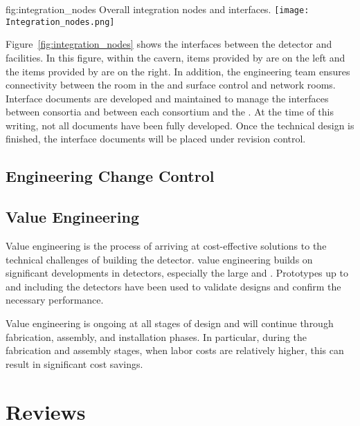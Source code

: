 \begin{dunefigure}{fig:integration_nodes}
  {Overall integration nodes and interfaces.}
  \texttt{[image: Integration\_nodes.png]}
\end{dunefigure}

Figure~\ref{fig:integration_nodes} shows the interfaces between the
detector and facilities. In this figure, within the cavern, items
provided by  are on the left and the items provided by
 are on the right. In addition, the  engineering
team ensures connectivity between the  room in the  and
surface control and network rooms.  Interface documents are developed and maintained to manage the
interfaces %
between consortia and between %
each consortium and the  . At the time of this writing, not all
documents have been fully developed. Once the technical design is
finished, the interface documents will be placed under revision
control.

\subsection{Engineering Change Control}

\subsection{Value Engineering}
\label{sec:es-tc-fdsp-coord-ve}

Value engineering is the process of arriving at cost-effective
solutions to the technical challenges of building the 
detector.  value engineering builds on significant
developments in  detectors,  
especially the large   and
. Prototypes up to and including the  
detectors have been used to validate
 designs and confirm the necessary performance. 

Value engineering is ongoing at all stages of design and will continue
through fabrication, assembly, and installation phases. In
particular, during the fabrication and assembly stages, when labor costs
are relatively higher, this can result in significant cost savings. 

\section{Reviews}
\label{sec:es-tc-reviews}



